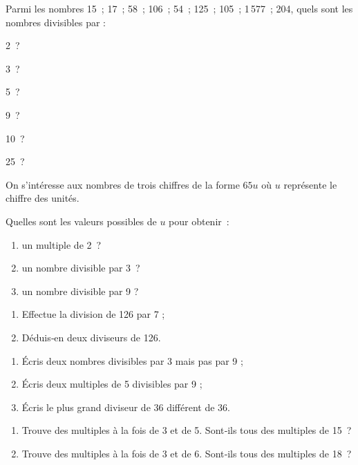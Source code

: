 \begin{exercice}
Parmi les nombres 15 ; 17 ; 58 ; 106 ; 54 ; 125 ; 105 ; 1\,577 ; 204, quels sont les nombres divisibles par :
\begin{colenumerate}{3}     
 \item 2 ?
 \item 3 ?
 \item 5 ?
 \item 9 ?
 \item 10 ?
 \item 25 ?
 \end{colenumerate}
\end{exercice} 

\begin{exercice} On s'intéresse aux nombres de trois chiffres de la forme $65 u$ où $u$ représente le chiffre des unités.

Quelles sont les valeurs possibles de $u$ pour obtenir :
\begin{enumerate}
 \item un multiple de 2 ?
 \item un nombre divisible par 3 ?
 \item un nombre divisible par 9 ?
 \end{enumerate}
\end{exercice} 

\begin{exercice}
\begin{enumerate}
 \item Effectue la division de 126 par 7 ;
 \item Déduis‑en deux diviseurs de 126.
 \end{enumerate}
\end{exercice} 

\begin{exercice}[Diviseurs]
\begin{enumerate}
 \item Écris deux nombres divisibles par 3 mais pas par 9 ;
 \item Écris deux multiples de 5 divisibles par 9 ;
 \item Écris le plus grand diviseur de 36 différent de 36.
 \end{enumerate}
\end{exercice} 

\begin{exercice}[Multiples]
\begin{enumerate}
 \item Trouve des multiples à la fois de 3 et de 5. Sont‑ils tous des multiples de 15 ?
 \item Trouve des multiples à la fois de 3 et de 6. Sont‑ils tous des multiples de 18 ?
 \end{enumerate}
\end{exercice} 

